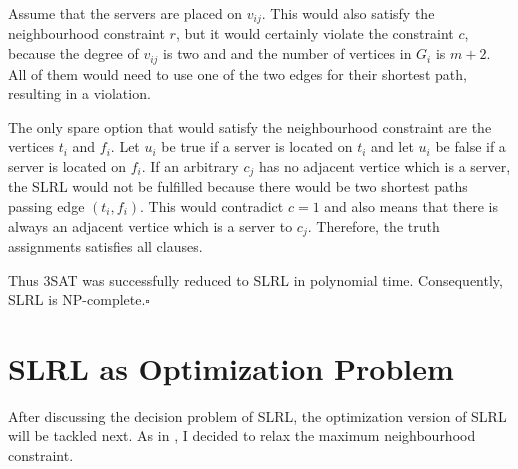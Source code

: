\documentclass [12pt]{article}
\begin{document}
  \noindent
  Assume that the servers are placed on $v_{ij}$. This would also satisfy the neighbourhood 
      constraint $r$, but it would certainly violate the constraint $c$, because the degree of $v_{ij}$ is two and
      and the number of vertices in $G_i$ is $m+2$. All of them would need to use one of the two edges for their shortest path,
    resulting in a violation.
  \medskip

  \noindent
  The only spare option that would satisfy the neighbourhood constraint 
      are the vertices $t_i$ and $f_i$. Let $u_i$ be true if a server is located on
      $t_i$ and let $u_i$ be false if a server is located on $f_i$.  
      If an arbitrary $c_j$ has no adjacent vertice which is a server,
      the SLRL would not be fulfilled because there would be two shortest paths passing edge
      $(t_i,f_i)$. This would contradict $c = 1$ and also means that there is always an adjacent vertice which is a server to $c_j$.
      Therefore, the truth assignments satisfies all clauses.
  \medskip

  \noindent
Thus 3SAT was successfully reduced to SLRL in polynomial time.
Consequently, SLRL is NP-complete.$\square$

\section{SLRL as Optimization Problem}

After discussing the decision problem of SLRL, the optimization version
of SLRL will be tackled next. As in \cite{mirrorserver}, I decided to relax the maximum 
neighbourhood constraint.
\end{document}
